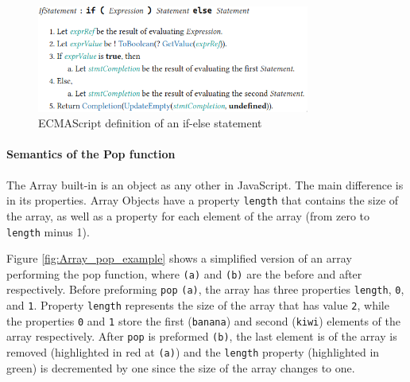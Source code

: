 \documentclass[runningheads]{llncs}
\begin{document}
\begin{figure}[ht]
    \centering
    \includegraphics[width=0.8\textwidth]{images/if_statement.png}
    \caption{ECMAScript definition of an if-else statement}
    \label{fig:If-Else Statement}
\end{figure}

\paragraph{Semantics of the Pop function}
The Array built-in is an object as any other in JavaScript. The main difference is in its properties. Array Objects have a property \texttt{length} that contains the size of the array, as well as a property for each element of the array (from zero to \texttt{length} minus 1).

Figure \ref{fig:Array_pop_example} shows a simplified version of an array performing the pop function, where \texttt{(a)} and \texttt{(b)} are the before and after respectively.
Before preforming \texttt{pop} \texttt{(a)}, the array has three  properties \texttt{length}, \texttt{0}, and \texttt{1}. Property \texttt{length} represents the size of the array that has value \texttt{2}, while the properties \texttt{0} and \texttt{1} store the first (\texttt{banana}) and second (\texttt{kiwi}) elements of the array respectively.
After \texttt{pop} is preformed \texttt{(b)}, the last element is of the array is removed (highlighted in red at \texttt{(a)}) and the \texttt{length} property (highlighted in green) is decremented by one since the size of the array changes to one.
\end{document}
